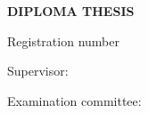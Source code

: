\thispagestyle{plain}
\begin{center}
\vspace*{1cm}
{\Large\bfseries DIPLOMA THESIS\par}
\vspace{1.5em}
{\LARGE\bfseries \thTitleEN\par}
\vspace{0.8em}
{\large\itshape\gr{\thTitleEL}\par}
\vspace{2.5em}
{\Large\bfseries \thAuthorEN\par}
{\large Registration number \thAM\par}
\vspace{2.5em}
{\large Supervisor:\par}
{\large \thSupervisorEN\par}
\vspace{1.4cm}%
{\large Examination committee:\par}
\vspace{0.4em}
{\large \thExamA\par}
\vspace{1.4cm}
{\large \thExamB\par}
\vspace{1.4cm}
{\large \thExamDateEN\par}
\end{center}
\clearpage
